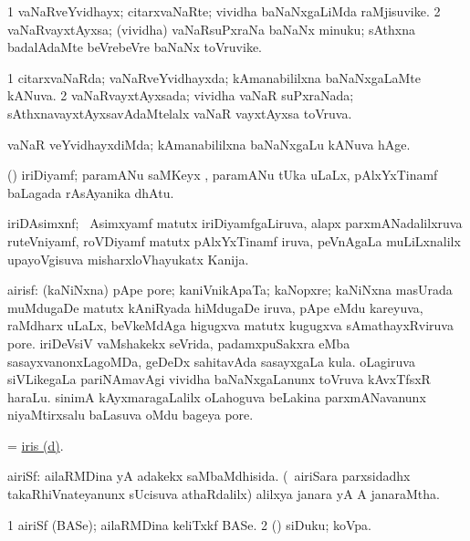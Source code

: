 \bentry
{}
\gl{\nA}
\bmng
\bnum
\num{1} vaNaRveYvidhayx; citarxvaNaRte; vividha baNaNxgaLiMda raMjisuvike. 
\num{2} vaNaRvayxtAyxsa; (vividha) vaNaRsuPxraNa baNaNx minuku; sAthxna badalAdaMte beVrebeVre baNaNx toVruvike. 
\enum
\emng
\eentry

\bentry
{}
\gl{\gu}
\bmng
\bnum
\num{1} citarxvaNaRda; vaNaRveYvidhayxda; kAmanabililxna baNaNxgaLaMte kANuva. 
\num{2} vaNaRvayxtAyxsada; vividha vaNaR suPxraNada; sAthxnavayxtAyxsavAdaMtelalx vaNaR vayxtAyxsa toVruva. 
\enum
\emng
\eentry

\bentry
{}
\gl{\kirxvi}
\bmng
vaNaR veYvidhayxdiMda; kAmanabililxna baNaNxgaLu kANuva hAge. 
\emng
\eentry

\bentry
{}
\gl{\nA}
\bmng
(\ravi) iriDiyamf; paramANu saMKeyx , paramANu tUka  uLaLx, pAlxYxTinamf baLagada rAsAyanika dhAtu. 
\emng
\eentry

\bentry
{}
\gl{\nA}
\bmng
iriDAsimxnf; \kanmu\ Asimxyamf matutx iriDiyamfgaLiruva, alapx parxmANadalilxruva ruteVniyamf, roVDiyamf matutx pAlxYxTinamf iruva, peVnAgaLa muLiLxnalilx upayoVgisuva misharxloVhayukatx Kanija. 
\emng
\eentry

\bentry
{}
\gl{\nA}
\bmng
airisf: 
\banum
{} (kaNiNxna) pApe pore; kaniVnikApaTa; kaNopxre; kaNiNxna masUrada muMdugaDe matutx kAniRyada hiMdugaDe iruva, pApe eMdu kareyuva, raMdharx uLaLx, beVkeMdAga higugxva matutx kugugxva sAmathayxRviruva pore. 
 iriDeVsiV vaMshakekx seVrida, padamxpuSakxra eMba sasayxvanonxLagoMDa, geDeDx sahitavAda sasayxgaLa kula. 
 oLagiruva siVLikegaLa pariNAmavAgi vividha baNaNxgaLanunx toVruva kAvxTfsxR haraLu. 
\hypertarget{iris(d)}{} 
 sinimA kAyxmaragaLalilx oLahoguva beLakina parxmANavanunx niyaMtirxsalu baLasuva oMdu bageya pore. 
\eanum
\emng
\eentry

\bentry
{}
\gl{\nA}
\bmng
= \hyperlink{iris(d)}{iris (d)}. 
\emng
\eentry

\bentry
{}
\gl{\gu}
\bmng
airiSf: 
\banum
{} ailaRMDina yA adakekx saMbaMdhisida. 
 (\kanmu\ airiSara parxsidadhx takaRhiVnateyanunx sUcisuva athaRdalilx) alilxya janara yA A janaraMtha. 
\eanum
\emng
\eentry

\bentry
{}
\gl{\nA}
\bmng
\bnum
\num{1} airiSf (BASe); ailaRMDina keliTxkf BASe. 
\num{2} (\AmA) siDuku; koVpa. 
\enum
\emng

